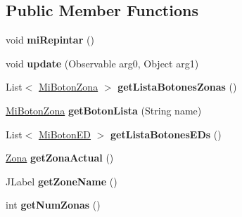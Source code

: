 \subsection*{Public Member Functions}
\begin{DoxyCompactItemize}
\item 
\mbox{\label{classvista_1_1_ventana_principal_aac56c6c6f900b7a17c1797f343f68164}} 
void {\bfseries mi\+Repintar} ()
\item 
\mbox{\label{classvista_1_1_ventana_principal_a3d43755ba8664a494b1f79b97b82184a}} 
void {\bfseries update} (Observable arg0, Object arg1)
\item 
\mbox{\label{classvista_1_1_ventana_principal_a1b0d8e63220452c9089ff1f2ba863387}} 
List$<$ \mbox{\hyperlink{classvista_1_1_mi_boton_zona}{Mi\+Boton\+Zona}} $>$ {\bfseries get\+Lista\+Botones\+Zonas} ()
\item 
\mbox{\label{classvista_1_1_ventana_principal_a279cf62616a4bff041a1d0404bbcc89d}} 
\mbox{\hyperlink{classvista_1_1_mi_boton_zona}{Mi\+Boton\+Zona}} {\bfseries get\+Boton\+Lista} (String name)
\item 
\mbox{\label{classvista_1_1_ventana_principal_ad8b984ff16c9841f85d1d7b40b8a75e6}} 
List$<$ \mbox{\hyperlink{classvista_1_1_mi_boton_e_d}{Mi\+Boton\+ED}} $>$ {\bfseries get\+Lista\+Botones\+E\+Ds} ()
\item 
\mbox{\label{classvista_1_1_ventana_principal_a58cc9285cb9179a66284f52a2e7d0dd9}} 
\mbox{\hyperlink{classmodelo_1_1_zona}{Zona}} {\bfseries get\+Zona\+Actual} ()
\item 
\mbox{\label{classvista_1_1_ventana_principal_a1534a5187e8ce83f76c44abc02cb2236}} 
J\+Label {\bfseries get\+Zone\+Name} ()
\item 
\mbox{\label{classvista_1_1_ventana_principal_a7303665d4193ebf7c4693846114fb96d}} 
int {\bfseries get\+Num\+Zonas} ()
\item 
\mbox{\label{classvista_1_1_ventana_principal_a740a2cfb769129790ed6026fba51988b}} 

\end{DoxyCompactItemize}
